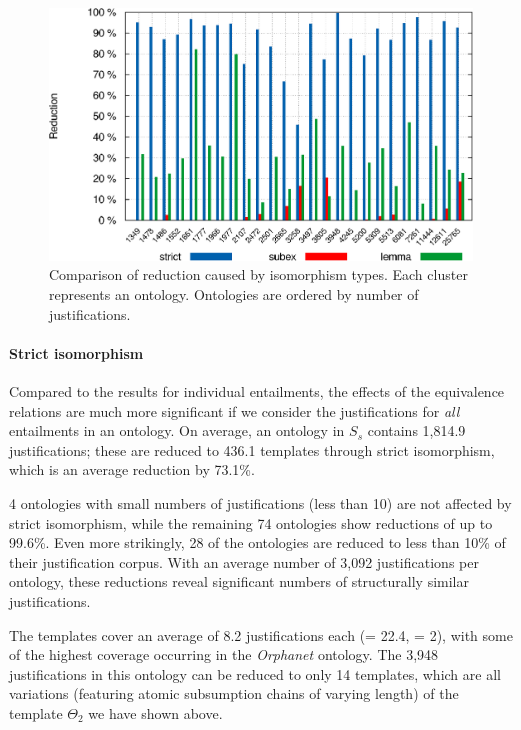 \begin{figure}
\centering
\includegraphics[width=14cm]{plots/iso-comparison.pdf}
\caption[Comparison of reduction caused by isomorphism types.]{Comparison of reduction caused by isomorphism types. Each cluster represents an ontology. Ontologies are ordered by number of justifications.}
\label{fig:iso-comparison}
\end{figure}


\paragraph{Strict isomorphism}

Compared to the results for individual entailments, the effects of the equivalence relations are much more significant if we consider the justifications for \emph{all} entailments in an ontology. On average, an ontology in $S_{s}$ contains 1,814.9 justifications; these are reduced to 436.1 templates through strict isomorphism, which is an average reduction by 73.1\%.

4 ontologies with small numbers of justifications (less than 10) are not affected by strict isomorphism, while the remaining 74 ontologies show reductions of up to 99.6\%. Even more strikingly, 28 of the ontologies are reduced to less than 10\% of their justification corpus. With an average number of 3,092 justifications per ontology, these reductions reveal significant numbers of structurally similar justifications.

The templates cover an average of 8.2 justifications each (\sdev = 22.4, \median = 2), with some of the highest coverage occurring in the \emph{Orphanet} ontology. The 3,948 justifications in this ontology can be reduced to only 14 templates, which are all variations (featuring atomic subsumption chains of varying length) of the template $\Theta_{2}$ we have shown above.


